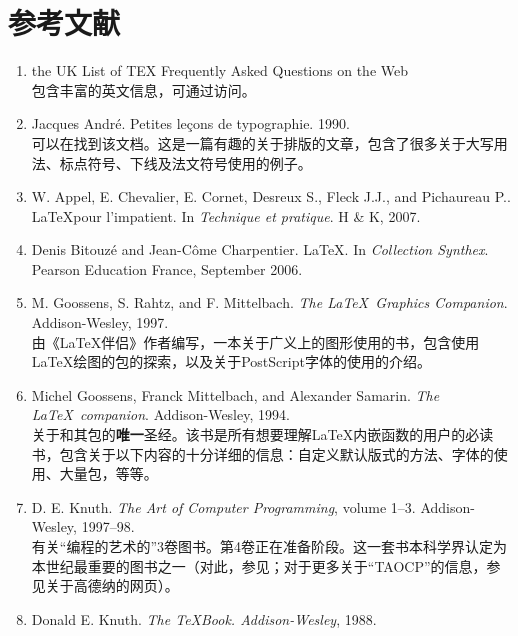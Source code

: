 \chapter*{参考文献}

\begin{enumerate}
    \renewcommand{\labelenumi}{[\theenumi]}
    \item the UK List of TEX Frequently Asked Questions on the Web\\
    包含丰富的英文信息，可通过访问。
    \item Jacques André. Petites leçons de typographie. 1990.\\
    可以在找到该文档。这是一篇有趣的关于排版的文章，包含了很多关于大写用法、标点符号、下线及法文符号使用的例子。
    \item W. Appel, E. Chevalier, E. Cornet, Desreux S., Fleck J.J., and Pichaureau P.. \LaTeX pour l'impatient. In \emph{Technique et pratique}. H \& K, 2007.
    \item Denis Bitouzé and Jean-Côme Charpentier. \LaTeX . In \emph{Collection Synthex}. Pearson Education France, September 2006.
    \item M. Goossens, S. Rahtz, and F. Mittelbach. \emph{The \LaTeX \ Graphics Companion}. Addison-Wesley, 1997.\\
    由《\LaTeX 伴侣》作者编写，一本关于广义上的图形使用的书，包含使用\LaTeX 绘图的包的探索，以及关于PostScript字体的使用的介绍。
    \item Michel Goossens, Franck Mittelbach, and Alexander Samarin. \emph{The \LaTeX \ companion}. \linebreak Addison-Wesley, 1994.\\
    关于\LaTeXe 和其包的\textbf{唯一}圣经。该书是所有想要理解\LaTeX 内嵌函数的用户的必读书，包含关于以下内容的十分详细的信息：自定义默认版式的方法、字体的使用、大量包，等等。
    \item D. E. Knuth. \emph{The Art of Computer Programming}, volume 1–3. Addison-Wesley, 1997–98.\\
    有关“编程的艺术的”3卷图书。第4卷正在准备阶段。这一套书本科学界认定为本世纪最重要的图书之一（对此，参见；对于更多关于“TAOCP”的信息，参见关于高德纳的网页）。
    \item Donald E. Knuth. \emph{The \TeX Book. Addison-Wesley}, 1988.\\

\end{enumerate}
